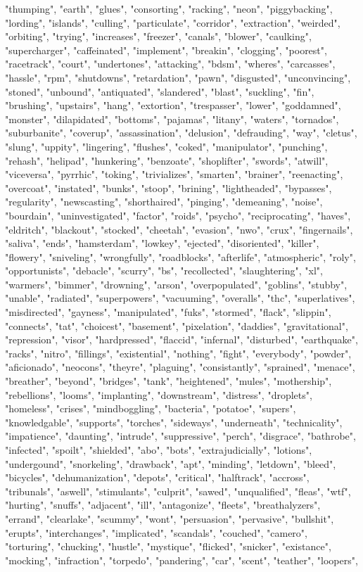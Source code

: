 "thumping", "earth", "glues", "consorting", "racking", "neon", "piggybacking", "lording", "islands", "culling", "particulate", "corridor", "extraction", "weirded", "orbiting", "trying", "increases", "freezer", "canals", "blower", "caulking", "supercharger", "caffeinated", "implement", "breakin", "clogging", "poorest", "racetrack", "court", "undertones", "attacking", "bdsm", "wheres", "carcasses", "hassle", "rpm", "shutdowns", "retardation", "pawn", "disgusted", "unconvincing", "stoned", "unbound", "antiquated", "slandered", "blast", "suckling", "fin", "brushing", "upstairs", "hang", "extortion", "trespasser", "lower", "goddamned", "monster", "dilapidated", "bottoms", "pajamas", "litany", "waters", "tornados", "suburbanite", "coverup", "assassination", "delusion", "defrauding", "way", "cletus", "slung", "uppity", "lingering", "flushes", "coked", "manipulator", "punching", "rehash", "helipad", "hunkering", "benzoate", "shoplifter", "swords", "atwill", "viceversa", "pyrrhic", "toking", "trivializes", "smarten", "brainer", "reenacting", "overcoat", "instated", "bunks", "stoop", "brining", "lightheaded", "bypasses", "regularity", "newscasting", "shorthaired", "pinging", "demeaning", "noise", "bourdain", "uninvestigated", "factor", "roids", "psycho", "reciprocating", "haves", "eldritch", "blackout", "stocked", "cheetah", "evasion", "nwo", "crux", "fingernails", "saliva", "ends", "hamsterdam", "lowkey", "ejected", "disoriented", "killer", "flowery", "sniveling", "wrongfully", "roadblocks", "afterlife", "atmospheric", "roly", "opportunists", "debacle", "scurry", "bs", "recollected", "slaughtering", "xl", "warmers", "bimmer", "drowning", "arson", "overpopulated", "goblins", "stubby", "unable", "radiated", "superpowers", "vacuuming", "overalls", "thc", "superlatives", "misdirected", "gayness", "manipulated", "fuks", "stormed", "flack", "slippin", "connects", "tat", "choicest", "basement", "pixelation", "daddies", "gravitational", "repression", "visor", "hardpressed", "flaccid", "infernal", "disturbed", "earthquake", "racks", "nitro", "fillings", "existential", "nothing", "fight", "everybody", "powder", "aficionado", "neocons", "theyre", "plaguing", "consistantly", "sprained", "menace", "breather", "beyond", "bridges", "tank", "heightened", "mules", "mothership", "rebellions", "looms", "implanting", "downstream", "distress", "droplets", "homeless", "crises", "mindboggling", "bacteria", "potatoe", "supers", "knowledgable", "supports", "torches", "sideways", "underneath", "technicality", "impatience", "daunting", "intrude", "suppressive", "perch", "disgrace", "bathrobe", "infected", "spoilt", "shielded", "abo", "bots", "extrajudicially", "lotions", "undergound", "snorkeling", "drawback", "apt", "minding", "letdown", "bleed", "bicycles", "dehumanization", "depots", "critical", "halftrack", "accross", "tribunals", "aswell", "stimulants", "culprit", "sawed", "unqualified", "fleas", "wtf", "hurting", "snuffs", "adjacent", "ill", "antagonize", "fleets", "breathalyzers", "errand", "clearlake", "scummy", "wont", "persuasion", "pervasive", "bullshit", "erupts", "interchanges", "implicated", "scandals", "couched", "camero", "torturing", "chucking", "hustle", "mystique", "flicked", "snicker", "existance", "mocking", "infraction", "torpedo", "pandering", "car", "scent", "teather", "loopers", 